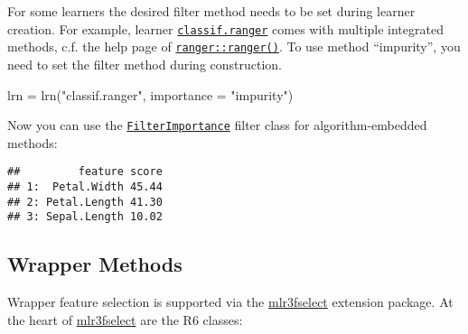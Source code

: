 \documentclass[
]{scrbook}
\newenvironment{Shaded}{\begin{snugshade}}{\end{snugshade}}
\newcommand{\AttributeTok}[1]{\textcolor[rgb]{0.77,0.63,0.00}{#1}}
\newcommand{\DecValTok}[1]{\textcolor[rgb]{0.00,0.00,0.81}{#1}}
\newcommand{\FunctionTok}[1]{\textcolor[rgb]{0.00,0.00,0.00}{#1}}
\newcommand{\NormalTok}[1]{#1}
\newcommand{\OtherTok}[1]{\textcolor[rgb]{0.56,0.35,0.01}{#1}}
\newcommand{\SpecialCharTok}[1]{\textcolor[rgb]{0.00,0.00,0.00}{#1}}
\newcommand{\StringTok}[1]{\textcolor[rgb]{0.31,0.60,0.02}{#1}}
\renewenvironment{Shaded} {\begin{snugshade}\small} {\end{snugshade}}
\begin{document}
For some learners the desired filter method needs to be set during learner creation.
For example, learner \href{https://mlr3learners.mlr-org.com/reference/mlr_learners_classif.ranger.html}{\texttt{classif.ranger}} comes with multiple integrated methods, c.f. the help page of \href{https://www.rdocumentation.org/packages/ranger/topics/ranger}{\texttt{ranger::ranger()}}.
To use method ``impurity'', you need to set the filter method during construction.

\begin{Shaded}
\begin{Highlighting}[]
\NormalTok{lrn }\OtherTok{=} \FunctionTok{lrn}\NormalTok{(}\StringTok{"classif.ranger"}\NormalTok{, }\AttributeTok{importance =} \StringTok{"impurity"}\NormalTok{)}
\end{Highlighting}
\end{Shaded}

Now you can use the \href{https://mlr3filters.mlr-org.com/reference/mlr_filters_importance.html}{\texttt{FilterImportance}} filter class for algorithm-embedded methods:

\begin{Shaded}
\end{Shaded}

\begin{verbatim}
##         feature score
## 1:  Petal.Width 45.44
## 2: Petal.Length 41.30
## 3: Sepal.Length 10.02
\end{verbatim}

\hypertarget{fs-wrapper}{%
\subsection{Wrapper Methods}\label{fs-wrapper}}

Wrapper feature selection is supported via the \href{https://mlr3fselect.mlr-org.com}{mlr3fselect} extension package.
At the heart of \href{https://mlr3fselect.mlr-org.com}{mlr3fselect} are the R6 classes:
\end{document}
